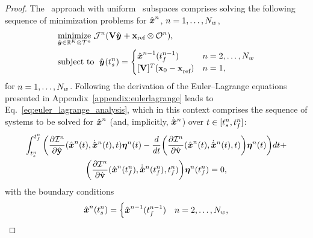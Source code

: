 \begin{proof}
The \methodAcronym\ approach with uniform \spatialAcronym\ subspaces comprises solving the following sequence of minimization problems for $\hat{ \boldsymbol x}^{n}$, $n=1,\ldots,N_w$,
\begin{equation}\label{eq:obj_proof}
\begin{split}
      & \underset{\genstateyArgnt{} \in \RR{\romdim} \otimes \timeSpaceArg{n}}{\text{minimize}}\; \mathcal{J}^n(\basisspace \genstateyArgnt{} + \stateIntercept \otimes \onesFunctionArg{n}), \\ 
      & \text{subject to }\; \genstateyArg{}{\timeStartArg{n}} =
\begin{cases} \genstateArg{n-1}{\timeEndArg{n-1}} & n = 2,\ldots,\nslabs \\
\genstateIC & n=1, \end{cases} 
\end{split}
\end{equation}
for $n = 1,\ldots,N_w$. Following the derivation of the Euler--Lagrange equations presented in Appendix~\ref{appendix:eulerlagrange} leads to Eq.~\eqref{eq:euler_lagrange_analysis}, which in this context comprises the sequence of systems to be solved for $\hat{ \boldsymbol x}^n$ (and, implicitly, $\dot{\hat{ \boldsymbol x}}^{n}$) over $t \in [t_s^{n},t_f^{n}]$:
\begin{multline}\label{eq:g_equiv_1}
 \int_{t_s^{n}}^{t_f^{n}} \bigg( \frac{\partial \mathcal{I}^{n}  }{\partial \hat{\mathbf{y}} }(\hat{ \boldsymbol x}^{n}(t),\dot{\hat{ \boldsymbol x}}^{n}(t),t)  \boldsymbol \eta^{n}(t)  - \frac{d}{dt}\bigg( \frac{\partial \mathcal{I}^{n}}{\partial \hat{\mathbf{v}}} (\hat{ \boldsymbol x}^{n}(t),\dot{\hat{ \boldsymbol x}}^{n}(t),t ) \bigg) \boldsymbol \eta^{n}(t) \bigg)dt +\\ \bigg(\frac{\partial \mathcal{I}^{n}}{\partial \hat{\mathbf{v}}}(\hat{ \boldsymbol x}^{n}(t_f^{n}),\dot{\hat{ \boldsymbol x}}^{n}(t_f^{n}),t_f^{n}) \bigg) \boldsymbol \eta^{n}(t_f^{n})   = 0,
\end{multline}
with the boundary conditions
\begin{equation*}
 \hat{ \boldsymbol x}^n(t_s^{n})  = 
\begin{cases}
\hat{ \boldsymbol x}^{n-1}(t_f^{n-1}) & n=2,\ldots,N_w, \\

\end{cases}
\end{equation*}
\end{proof}
